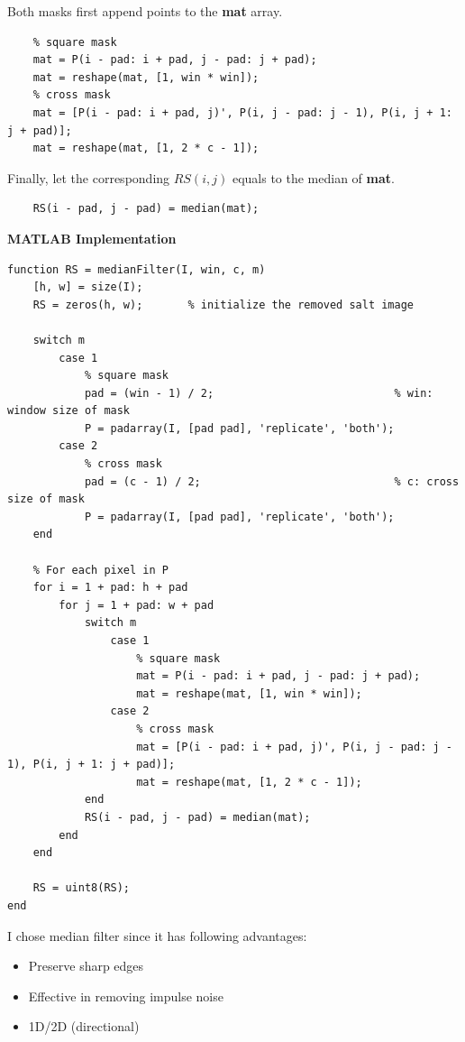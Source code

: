 \documentclass{article}
\newcommand{\tb}{\textbf}
\begin{document}
\begin{enumerate}[label=(\alph*)]
    Both masks first append points to the \tb{mat} array.

\begin{lstlisting}
    % square mask
    mat = P(i - pad: i + pad, j - pad: j + pad);
    mat = reshape(mat, [1, win * win]);
    % cross mask
    mat = [P(i - pad: i + pad, j)', P(i, j - pad: j - 1), P(i, j + 1: j + pad)];
    mat = reshape(mat, [1, 2 * c - 1]);
\end{lstlisting}
    
    Finally, let the corresponding $RS(i, j)$ equals to the median of \tb{mat}.

\begin{lstlisting}
    RS(i - pad, j - pad) = median(mat);
\end{lstlisting}

\tb{MATLAB Implementation}
\begin{lstlisting}
function RS = medianFilter(I, win, c, m)
    [h, w] = size(I);
    RS = zeros(h, w);       % initialize the removed salt image
    
    switch m
        case 1
            % square mask
            pad = (win - 1) / 2;                            % win: window size of mask
            P = padarray(I, [pad pad], 'replicate', 'both');
        case 2
            % cross mask
            pad = (c - 1) / 2;                              % c: cross size of mask
            P = padarray(I, [pad pad], 'replicate', 'both');
    end
    
    % For each pixel in P
    for i = 1 + pad: h + pad
        for j = 1 + pad: w + pad
            switch m
                case 1
                    % square mask
                    mat = P(i - pad: i + pad, j - pad: j + pad);
                    mat = reshape(mat, [1, win * win]);
                case 2
                    % cross mask
                    mat = [P(i - pad: i + pad, j)', P(i, j - pad: j - 1), P(i, j + 1: j + pad)];
                    mat = reshape(mat, [1, 2 * c - 1]);
            end
            RS(i - pad, j - pad) = median(mat);
        end
    end
    
    RS = uint8(RS);
end
\end{lstlisting}

    I chose median filter since it has following advantages:

    \begin{itemize}
        \item Preserve sharp edges
        \item Effective in removing impulse noise
        \item 1D/2D (directional)
    \end{itemize}
    

\end{enumerate}
\end{document}
